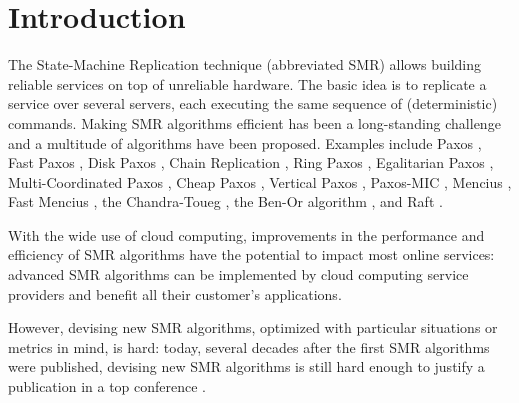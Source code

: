 \section{Introduction}

The State-Machine Replication technique (abbreviated SMR) allows
building reliable services on top of unreliable hardware. The basic idea is to 
replicate a service over several servers, each executing the same
sequence of (deterministic) commands. 
Making SMR algorithms efficient has been a long-standing
challenge and a multitude of algorithms have been proposed. Examples
include Paxos \cite{lamport2001paxos}, Fast Paxos \cite{Lamport06FastPaxos}, Disk Paxos
\cite{GafniLamport03DiskPaxos}, Chain Replication
\cite{RenesseSchneider04ChainReplicationSupportingHighThroughputAvailability},
Ring Paxos
\cite{MarandiETAL10RingPaxosHighthroughputAtomicBroadcastProtocol},
Egalitarian Paxos
\cite{MoraruAndersenKaminsky13ThereIsMoreConsensusEgalitarianParliaments},
Multi-Coordinated Paxos
\cite{CamargosSchmidtPedone07MulticoordinatedPaxos}, Cheap Paxos
\cite{LamportMassa04CheapPaxos}, Vertical Paxos
\cite{LamportMalkhiZhou09VerticalPaxosPrimarybackupReplication},
Paxos-MIC
\cite{HurfinMoiseNarzul11AdaptiveFastPaxosMakingQuickEverlasting},
Mencius
\cite{MaoJunqueiraMarzullo08MenciusBuildingEfficientReplicatedStateMachine},
Fast Mencius \cite{WeiETAL13FastMenciusMenciusLowCommitLatency}, the Chandra-Toueg \cite{ChandraToueg96UnreliableFailureDetectorsReliableDistributedSystems}, the Ben-Or algorithm \cite{BenOr83AnotherAdvantageFreeChoiceCompletelyAsynchronous}, and Raft \cite{OngaroOusterhout14SearchUnderstandableConsensusAlgorithm}.

With the wide use of cloud computing, improvements in the performance and efficiency of SMR algorithms have the potential to impact most online services: advanced SMR algorithms can be implemented by cloud computing service providers and benefit all their customer's applications.

However, devising new SMR algorithms, optimized with particular situations or metrics in mind, is hard: today, several decades after the first SMR algorithms \cite{Lamport98ParttimeParliament,BirmanJoseph87ReliableCommunicationPresenceFailures,OkiLiskov88ViewstampedReplicationGeneralPrimaryCopy,DworkLynchStockmeyer84ConsensusPresencePartialSynchronyPreliminaryVersion} were published, devising new SMR algorithms is still hard enough to justify a publication in a top conference \cite{MoraruAndersenKaminsky13ThereIsMoreConsensusEgalitarianParliaments,OngaroOusterhout14SearchUnderstandableConsensusAlgorithm}.

